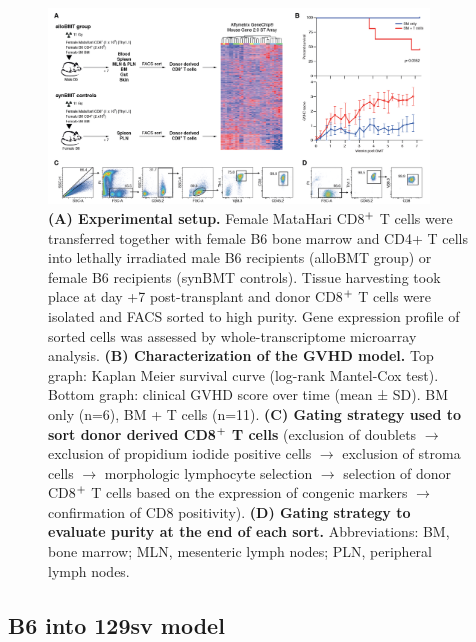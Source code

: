 \begin{figure}[H] 
    \centering
    \includegraphics[width=0.9\textwidth]{Figures/Chapter1/MataHari.png}
   \caption{\small{\textbf{(A) Experimental setup.} Female MataHari CD8$\textsuperscript{+}$ T cells were transferred together with female B6 bone marrow and CD4+ T cells into lethally irradiated male B6 recipients (alloBMT group) or female B6 recipients (synBMT controls). Tissue harvesting took place at day +7 post-transplant and donor CD8$\textsuperscript{+}$ T cells were isolated and FACS sorted to high purity. Gene expression profile of sorted cells was assessed by whole-transcriptome microarray analysis. \textbf{(B) Characterization of the GVHD model.} Top graph: Kaplan Meier survival curve (log-rank Mantel-Cox test). Bottom graph: clinical GVHD score over time (mean ± SD). BM only (n=6), BM + T cells (n=11). \textbf{(C) Gating strategy used to sort donor derived CD8$\textsuperscript{+}$ T cells} (exclusion of doublets $\to$ exclusion of propidium iodide positive cells $\to$ exclusion of stroma cells $\to$ morphologic lymphocyte selection $\to$ selection of donor CD8$\textsuperscript{+}$ T cells based on the expression of congenic markers $\to$ confirmation of CD8 positivity). \textbf{(D) Gating strategy to evaluate purity at the end of each sort.} Abbreviations: BM, bone marrow; MLN, mesenteric lymph nodes; PLN, peripheral lymph nodes.} }
    \label{fig:1}
\end{figure}

\subsection{B6 into 129sv model}

